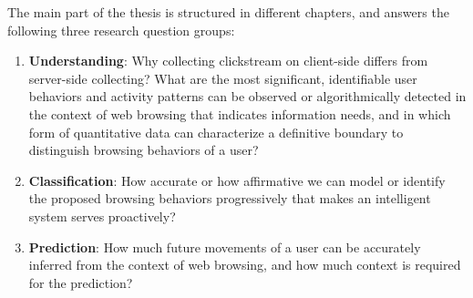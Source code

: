 
The main part of the thesis is structured in different chapters, and answers the following
three research question groups:

\begin{enumerate}
    \item \textbf{Understanding}: Why collecting clickstream on client-side differs 
        from server-side collecting?
        What are the most significant, identifiable user behaviors and activity patterns 
        can be observed or algorithmically detected in the context of web browsing that 
        indicates information needs,
        and in which form of quantitative data can characterize a definitive boundary to 
        distinguish browsing behaviors of a user?
    \item \textbf{Classification}: How accurate or how affirmative we can model or identify 
        the proposed browsing behaviors progressively that makes an intelligent system 
        serves proactively?
    \item \textbf{Prediction}: How much future movements of a user can be accurately inferred 
        from the context of web browsing, and how much context is required for the prediction?

\end{enumerate}

